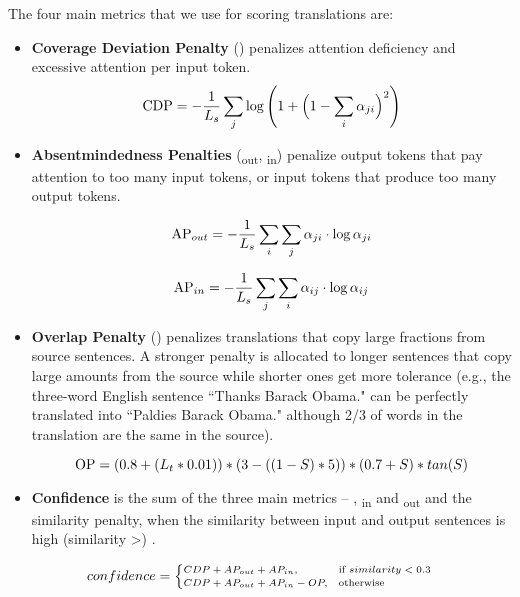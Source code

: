 \documentclass[runningheads,a4paper]{lncs/llncs}
\begin{document}
The four main metrics that we use for scoring translations are:
\begin{itemize}
  \item \textbf{Coverage Deviation Penalty} (\CDP) penalizes attention deficiency and excessive attention per input token.
  \begin{equation}
	{\rm CDP} = -\frac{1}{L_{s}} \sum_j \log \left(1 + \Bigl(1 - \sum_i \alpha_{ji} \Bigr)^2 \right)
  \end{equation}

  \item \textbf{Absentmindedness Penalties} (\AP\textsubscript{out}, \textsubscript{in}) penalize output tokens that pay attention to too many input tokens, or input tokens that produce too many output tokens.
  
  \begin{equation}
	{\rm AP}_{out} = -\frac{1}{L_{s}} \sum_i \sum_j \alpha_{ji} \cdot \log \alpha_{ji}
  \end{equation}

  \begin{equation}
	{\rm AP}_{in} = -\frac{1}{L_{s}} \sum_j \sum_i \alpha_{ij} \cdot \log \alpha_{ij}
  \end{equation}

  \item \textbf{Overlap Penalty} (\OP) penalizes translations that copy large fractions from source sentences. A stronger penalty is allocated to longer sentences that copy large amounts from the source while shorter ones get more tolerance (e.g., the three-word English sentence ``Thanks Barack Obama." can be perfectly translated into ``Paldies Barack Obama." although 2/3 of words in the translation are the same in the source). 




  \begin{equation}
	{\rm OP} = (0.8+(L_{t}*0.01)) * (3-((1-S)*5)) * (0.7 + S) * tan(S)
  \end{equation}



\item \textbf{Confidence} is the sum of the three main metrics -- \CDP{}, \AP{}\textsubscript{in} and \AP{}\textsubscript{out} and the similarity penalty, when the similarity between input and output sentences is high (similarity \textgreater {}) .
\end{itemize}
  \begin{equation}
    \scriptsize confidence = 
    \begin{cases}
        CDP + AP_{out} + AP_{in}, & \text{if } similarity<0.3 \\
        CDP + AP_{out} + AP_{in} - OP, & \text{otherwise}
    \end{cases}
  \end{equation}
\end{document}
